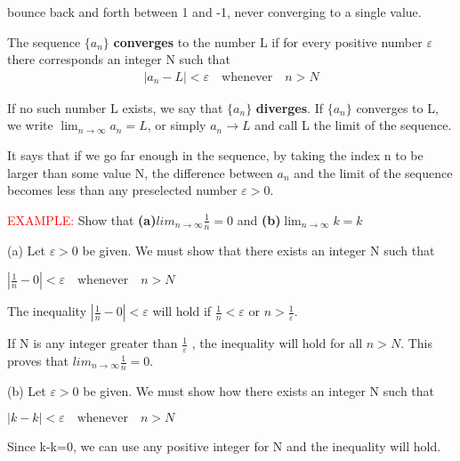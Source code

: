 \documentclass[12pt,a4paper]{article}
\newenvironment{definition}{\begin{definitionbox}}{\end{definitionbox}\vspace{1\baselineskip}}
\newcommand{\example}{\vspace{1\baselineskip}\par\noindent\textcolor{red}{EXAMPLE: }}
\begin{document}
bounce back and forth between 1 and -1, never converging to  a single value. 

\medskip

\begin{definition}
    The sequence \(\{a_{n}\}\) \textbf{converges} to the number L if for every positive number \(\varepsilon\) there corresponds an integer N such that
    \begin{align}
        \left\lvert a_n - L \right\rvert < \varepsilon \quad \text{whenever} \quad n > N
    \end{align}

    If no such number L exists, we say that $\{a_n\}$ \textbf{diverges}.
    If $\{a_n\}$ converges to L, we write $\lim_{n \to \infty} a_n = L $, or simply $a_n \to L$
    and call L the limit of the sequence.

\end{definition}



It says that if we go far enough in the sequence, by taking the index n to be larger than some value N, the difference between $a_n$ and the limit of the sequence becomes less than any preselected number $\varepsilon > 0$.

\smallskip
\newpage
\example Show that \textbf{(a)}$lim_{n \to \infty}\frac{1}{n} = 0$ and \textbf{(b)}$\lim_{n \to \infty} k = k $

(a) Let $\varepsilon > 0$ be given. We must show that there exists an integer N such that
\begin{center}
    $\left\lvert \frac{1}{n} - 0  \right\rvert < \varepsilon \quad \text{whenever} \quad n > N $

\end{center}


The inequality $\left\lvert \frac{1}{n} - 0\right\rvert < \varepsilon$ will hold if $\frac{1}{n} < \varepsilon$ or  $n > \frac{1}{\varepsilon}$.

If N is any integer greater than $\frac{1}{\varepsilon}$ , the inequality will hold for all $ n > N $. This proves that $lim_{n \to \infty}\frac{1}{n}=0$.

(b)
Let $\varepsilon > 0$ be given. We must show how there exists an integer N such that 

\begin{center}
    $\left\lvert k - k \right\rvert < \varepsilon \quad \text{whenever} \quad n > N$
\end{center}
Since k-k=0, we can use any positive integer for N and the inequality will hold. 
\end{document}

